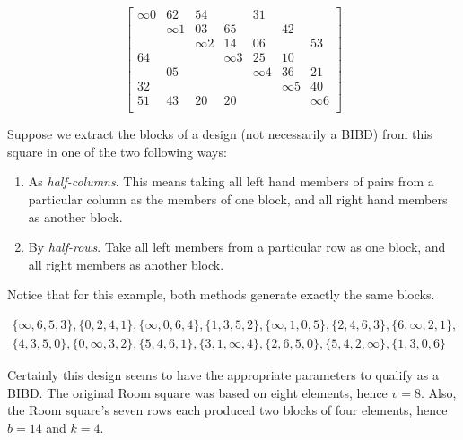 \documentclass[
  11pt,
  a4paper]{book}\usepackage[]{graphicx}\usepackage[]{xcolor}
\newcounter{example}
\begin{document}
\begin{equation}
  \begin{bmatrix}
    \infty 0 &    62    &    54    &            &    31    &            &          \\
             & \infty 1 &    03    &     65     &          &     42     &          \\
             &          & \infty 2 &     14     &    06    &            &    53    \\
      64     &          &          &  \infty 3  &    25    &     10     &          \\
             &    05    &          &            & \infty 4 &     36     &    21    \\
      32     &          &          &            &          &  \infty 5  &    40    \\
      51     &    43    &    20    &     20     &          &            & \infty 6 \\
  \end{bmatrix}
\end{equation}

Suppose we extract the blocks of a design (not necessarily a
BIBD) from this square in one of the two following ways:

\begin{enumerate}
 \item{As \emph{half-columns}. This means taking all left hand
    members of pairs from a particular column as the members
    of one block, and all right hand members as another
    block.}
 \item{By \emph{half-rows}. Take all left members from a particular
    row as one block, and all right members as another
    block.}
\end{enumerate}

Notice that for this example, both methods generate exactly
the same blocks.

\begin{equation}
\begin{split}
\{\infty,6,5,3\},\{0,2,4,1\},\{\infty,0,6,4\},\{1,3,5,2\},\{\infty,1,0,5\},\{2,4,6,3\},\{6, \infty,2,1\}, \\
\{4,3,5,0\},\{0,\infty,3,2\},\{5,4,6,1\},\{3,1,\infty,4\},\{2,6,5,0\},\{5,4,2,\infty\},\{1, 3,0,6\}
\end{split}
\end{equation}

Certainly this design seems to have the appropriate
parameters to qualify as a BIBD. The original Room square
was based on eight elements, hence $v = 8$. Also, the Room
square’s seven rows each produced two blocks of four elements,
hence $b = 14$ and $k = 4$.
\end{document}
